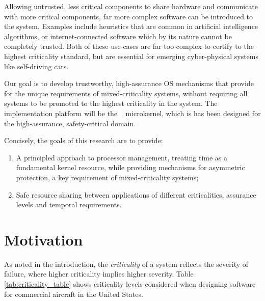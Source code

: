 Allowing untrusted, less critical components to
share hardware and communicate with more critical components, far more complex software can be
introduced to the system. Examples include heuristics that are common in artificial
intelligence algorithms, or internet-connected software which by its nature cannot be completely
trusted. Both of these use-cases are far too complex to certify to the highest criticality standard,
but are essential for emerging cyber-physical systems like self-driving cars. 

Our goal is to develop trustworthy, high-assurance \gls{OS} mechanisms that provide for the unique
requirements of mixed-criticality systems, without requiring all systems to be promoted to the highest
criticality in the system. 
The implementation platform will be the \selfour~\citep{Klein_EHACDEEKNSTW_09}
microkernel, which is has been designed for the high-assurance, safety-critical domain.

Concisely, the goals of this research are to provide:
\begin{enumerate}[label=\textbf{G\arabic*}] 
    \item\label{G1} A principled approach to
    processor management, treating time as a fundamental kernel resource, while
    providing mechanisms for asymmetric protection, a key requirement of mixed-criticality systems;
\item\label{G2} Safe resource sharing between applications of different criticalities, assurance levels and
    temporal requirements.  
\end{enumerate}

\section{Motivation}
\label{sec:motivation}

As noted in the introduction, the \emph{criticality} of a system reflects the
severity of failure, where higher criticality implies higher severity.  Table
\ref{tab:criticality_table} shows criticality levels considered when designing
software for commercial aircraft in the United States.

